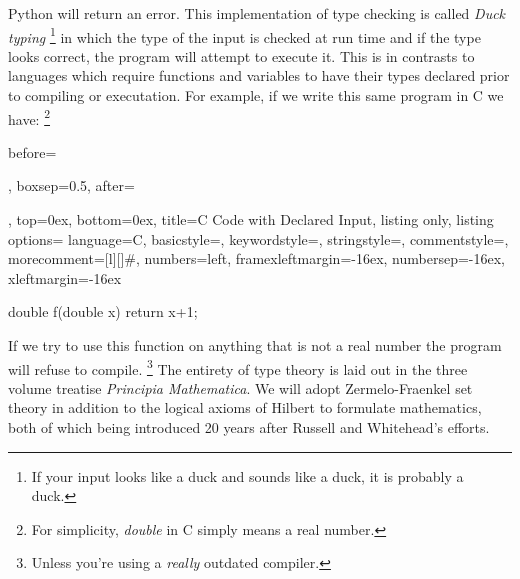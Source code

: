         Python will return an error. This implementation of type checking is
        called \textit{Duck typing}%
        \footnote{%
            If your input looks like a duck and sounds like a duck, it is
            probably a duck.
        }
        in which the type of the input is checked at run time and if the type
        looks correct, the program will attempt to execute it. This is in
        contrasts to languages which require functions and variables to have
        their types declared prior to compiling or executation. For example, if
        we write this same program in C we have:%
        \footnote{%
            For simplicity, \textit{double} in C simply means a real number.
        }
        \begin{tcblisting}{
            before=\par\vspace{2ex},
            boxsep=0.5\topsep,
            after=\par\vspace{2ex},
            top=0ex,
            bottom=0ex,
            title=C Code with Declared Input,
            listing only,
            listing options={
                language=C,
                basicstyle=\ttfamily,
                keywordstyle=\color{blue}\ttfamily,
                stringstyle=\color{red}\ttfamily,
                commentstyle=\color{green}\ttfamily,
                morecomment={[l][\color{magenta}]{\#}},
                numbers=left,
                framexleftmargin=-16ex,
                numbersep=-16ex,
                xleftmargin=-16ex
            }
        }
            double f(double x){
                return x+1;
            }
        \end{tcblisting}
        If we try to use this function on anything that is not a real number
        the program will refuse to compile.%
        \footnote{%
            Unless you're using a \textit{really} outdated compiler.
        }
        The entirety of type theory is laid out in the three volume
        treatise \textit{Principia Mathematica}. We will adopt Zermelo-Fraenkel
        set theory in addition to the logical
        axioms of Hilbert to formulate mathematics, both
        of which being introduced 20 years after Russell and Whitehead's
        efforts.
